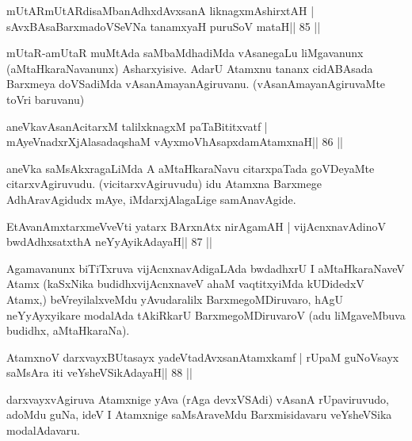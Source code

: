 \begin{shl}
mUtARmUtARdisaMbanAdhxdAvxsanA liknagxmAshirxtAH |
sAvxBAsaBarxmadoVSeVNa tanamxyaH puruSoV mataH\hfill || 85 ||
\end{shl}

\begin{artha}
mUtaR-amUtaR muMtAda saMbaMdhadiMda vAsanegaLu liMgavanunx
(aMtaHkaraNavanunx) Asharxyisive. AdarU Atamxnu tananx cidABAsada
Barxmeya doVSadiMda vAsanAmayanAgiruvanu. (vAsanAmayanAgiruvaMte toVri baruvanu)
\end{artha}

\begin{shl}
aneVkavAsanAcitarxM talilxknagxM paTaBititxvatf |
mAyeVnadxrXjAlasadaqshaM vAyxmoVhAsapxdamAtamxnaH\hfill || 86 ||
\end{shl}

\begin{artha}
aneVka saMsAkxragaLiMda A aMtaHkaraNavu citarxpaTada goVDeyaMte citarxvAgiruvudu. (vicitarxvAgiruvudu) idu Atamxna Barxmege AdhAravAgidudx mAye, iMdarxjAlagaLige samAnavAgide.
\end{artha}



\begin{shl}
EtAvanAmxtarxmeVveVti yatarx BArxnAtx nirAgamAH |
vijAcnxnavAdinoV bwdAdhxsatxthA neYyAyikAdayaH\hfill || 87 ||
\end{shl}

\begin{artha}
Agamavanunx biTiTxruva vijAcnxnavAdigaLAda bwdadhxrU I aMtaHkaraNaveV Atamx (kaSxNika budidhxvijAcnxnaveV ahaM vaqtitxyiMda kUDidedxV Atamx,) beVreyilalxveMdu yAvudaralilx BarxmegoMDiruvaro, hAgU neYyAyxyikare modalAda tAkiRkarU BarxmegoMDiruvaroV (adu liMgaveMbuva budidhx, aMtaHkaraNa).
\end{artha}


\begin{shl}
AtamxnoV darxvayxBUtasayx yadeVtadAvxsanAtamxkamf |
rUpaM guNoV\s sayx saMsAra iti veYsheVSikAdayaH\hfill || 88 ||
\end{shl}

\begin{artha}
darxvayxvAgiruva Atamxnige yAva (rAga devxVSAdi) vAsanA rUpaviruvudo,
adoMdu guNa, ideV I Atamxnige saMsAraveMdu Barxmisidavaru veYsheVSika
modalAdavaru.
\end{artha}

